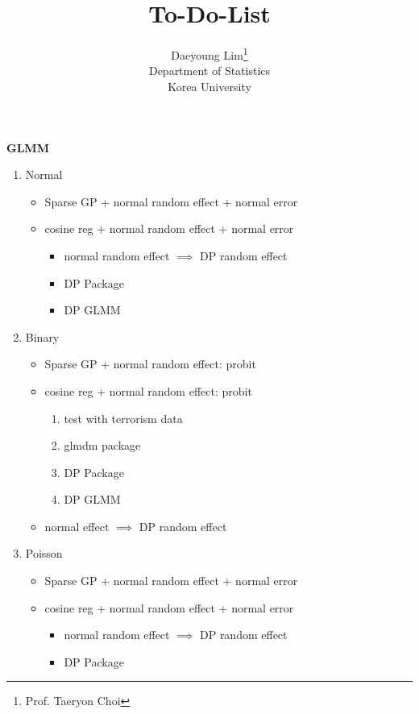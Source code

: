 \documentclass[11pt]{article}
\begin{document}
\nocite{*}

\title{To-Do-List}

\author{Daeyoung Lim\thanks{Prof. Taeryon Choi} \\
Department of Statistics \\
Korea University}

\maketitle
\textbf{GLMM}
\begin{enumerate}
  \item  Normal \begin{itemize}
    \item Sparse GP + normal random effect + normal error
    \item cosine reg + normal random effect + normal error \begin{itemize}
      \item normal random effect $\implies$ DP random effect
      \item DP Package
      \item DP GLMM
    \end{itemize}
  \end{itemize}
  \item Binary \begin{itemize}
    \item Sparse GP + normal random effect: probit
    \item cosine reg + normal random effect: probit \begin{enumerate}
      \item test with terrorism data
      \item {glmdm} package
      \item DP Package
      \item DP GLMM
    \end{enumerate}
    \item normal effect $\implies$ DP random effect
  \end{itemize}
  \item Poisson \begin{itemize}
    \item Sparse GP + normal random effect + normal error
    \item cosine reg + normal random effect + normal error \begin{itemize}
      \item normal random effect $\implies$ DP random effect
      \item DP Package

\end{itemize}
\end{itemize}
\end{enumerate}
\end{document}
